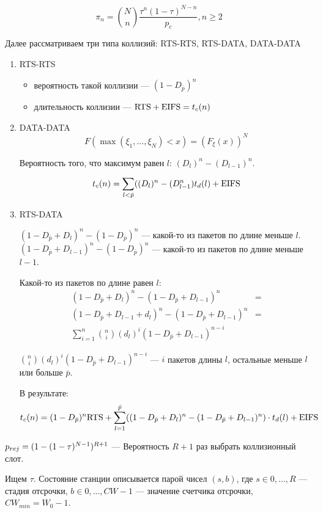 \[
\pi_n = {N \choose n} \frac{\tau^n (1 - \tau)^{N - n}}{p_c}, n \geq 2
\]

Далее рассматриваем три типа коллизий: RTS-RTS, RTS-DATA, DATA-DATA

\begin{enumerate}
\item RTS-RTS

\begin{itemize}
\item вероятность такой коллизии --- $(1 - D_{\bar{p}})^n$
\item длительность коллизии --- $\text{RTS} + \text{EIFS} = t_c(n)$
\end{itemize}

\item DATA-DATA
\[ F(\max(\xi_1, ..., \xi_N) < x) = (F_\xi (x))^N \]

Вероятность того, что максимум равен $l$: $(D_l)^n - (D_{l-1})^n$.

\[
t_c(n) = \sum_{l < \bar{p}} ((D_l)^n - (D_{l-1}^n) t_d(l) + \text{EIFS}
\]

\item RTS-DATA

$(1 - D_{\bar{p}} + D_l)^n - (1 - D_{\bar{p}})^n$ --- какой-то из пакетов по длине меньше $l$.
$(1 - D_{\bar{p}} + D_{l-1})^n - (1 - D_{\bar{p}})^n$ --- какой-то из пакетов по длине меньше $l - 1$.

Какой-то из пакетов по длине равен $l$:
\begin{align*}
(1 - D_{\bar{p}} + D_l)^n  - (1 - D_{\bar{p}} + D_{l-1})^n &= \\
(1 - D_{\bar{p}} + D_{l - 1} + d_l)^n - (1 - D_{\bar{p}} + D_{l - 1})^n &= \\
\sum_{i = 1}^n {{n \choose i} (d_l)^i (1 - D_{\bar{p}} + D_{l - 1})^{n - i}} &
\end{align*}

${n \choose i} (d_l)^i (1 - D_{\bar{p}} + D_{l - 1})^{n - i}$ --- $i$ пакетов длины $l$, остальные меньше $l$ или больше $\bar{p}$.

В результате:
\[
t_c(n) = (1 - D_{\bar{p}})^n \text{RTS} + \sum_{l = 1}^{\bar{p}} ((1 - D_{\bar{p}} + D_l)^n - (1 - D_{\bar{p}} + D_{l - 1})^n) \cdot t_d(l) + \text{EIFS}
\]
\end{enumerate}

$p_{rej} = (1 - (1 - \tau)^{N - 1})^{R + 1}$ --- Вероятность $R + 1$ раз выбрать коллизионный слот.

Ищем $\tau$.  Состояние станции описывается парой чисел $(s, b)$, где $s \in 0, ..., R$ --- стадия отсрочки, $b \in 0, ..., CW - 1$ --- значение счетчика отсрочки, $CW_{min} = W_0 - 1$.

